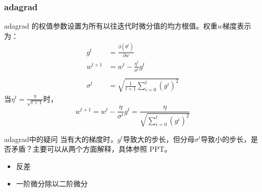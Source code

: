 \subsubsection{adagrad}
adagrad 的权值参数设置为所有以往迭代时微分值的均方根值。权重$w$梯度表示为：
\begin{align}
g^t &= \frac{\partial (\theta^t)}{\partial w}\\
w^{t+1} &= w^t - \frac{\eta^t}{\sigma^t}g^t\\
  \\
\sigma^t &= \sqrt{\frac{1}{t+1}\sum_{i=0}^{t}(g^i)^2}
\end{align}
当$\eta^t = \frac{\eta}{\sqrt{t+1}}$时，
\begin{equation}
w^{t+1} = w^t - \frac{\eta}{\sigma^t}g^t = \frac{\eta}{\sqrt{\sum_{i=0}^{t}(g^i)^2}}
\end{equation}
\begin{myquotation}{adagrad中的疑问}
	当有大的梯度时，$g^t$导致大的步长，但分母$\sigma ^ t$导致小的步长，是否矛盾？主要可以从两个方面解释，具体参照 PPT。
	\begin{itemize}
		\item 反差
		\item 一阶微分除以二阶微分
	\end{itemize}
\end{myquotation}

